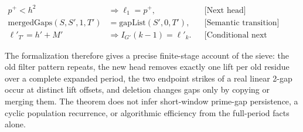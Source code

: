 \begin{equation*}
\begin{aligned}
p^+\lt h^2&\Longrightarrow \ell_1=p^+,
  &&\text{[Next head]} \\
\text{mergedGaps}(S,S',1,T')
&=\text{gapList}(S',0,T'),
  &&\text{[Semantic transition]} \\
\ell'_{T'}=h'+M'
&\Longrightarrow I_{G'}(k-1)=\ell'_k.
  &&\text{[Conditional next reconstruction]}
\end{aligned}
\end{equation*}

The formalization therefore gives a precise finite-stage account of the
sieve: the old filter pattern repeats, the new head removes exactly one
lift per old residue over a complete expanded period, the two endpoint
strikes of a real linear 2-gap occur at distinct lift offsets, and
deletion changes gaps only by copying or merging them. The theorem does
not infer short-window prime-gap persistence, a cyclic population
recurrence, or algorithmic efficiency from the full-period facts alone.
